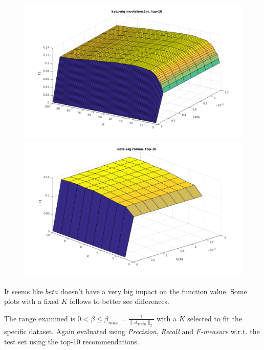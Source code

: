 \begin{figure}[h!]
\centering
\begin{minipage}{.5\textwidth}
    \centering
    \includegraphics[width=\linewidth]{fig/katzeig_beta_k/movielens_katzeig.png}
\end{minipage}%
\begin{minipage}{.5\textwidth}
    \centering
    \includegraphics[width=\linewidth]{fig/katzeig_beta_k/romeo_katzeig.png}
\end{minipage}
\end{figure}




It seems like $beta$ doesn't have a very big impact on the function value. Some plots with a fixed $K$ follows to better see differences.

The range examined is $0 < \beta \leq \beta_{max} = \frac{1}{\|A_{train}\|_2}$ with a $K$ selected to fit the specific dataset. Again evaluated using \textit{Precision}, \textit{Recall} and \textit{F-measure} w.r.t. the test set using the top-10 recommendations.


